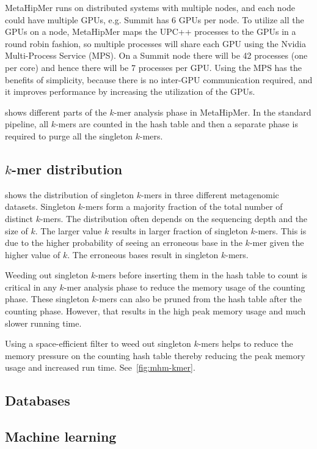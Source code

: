 MetaHipMer runs on distributed systems with multiple nodes, and each node could
have multiple GPUs, e.g. Summit has 6 GPUs per node. To utilize all the GPUs on
a node, MetaHipMer maps the UPC++ processes to the GPUs in a round robin
fashion, so multiple processes will share each GPU using the Nvidia
Multi-Process Service (MPS). On a Summit node there will be 42 processes (one
per core) and hence there will be 7 processes per GPU\@. Using the MPS has the
benefits of simplicity, because there is no inter-GPU communication required,
and it improves performance by increasing the utilization of the GPUs.

 shows different parts of the $k$-mer analysis phase in
MetaHipMer. In the standard pipeline, all $k$-mers are counted in the hash table
and then a separate phase is required to purge all the singleton $k$-mers.

\subsection{$k$-mer distribution}

 shows the distribution of singleton $k$-mers in three
different metagenomic datasets. Singleton $k$-mers form a majority fraction of
the total number of distinct $k$-mers. The distribution often depends on the
sequencing depth and the size of $k$. The larger value $k$ results in larger
fraction of singleton $k$-mers. This is due to the higher probability of seeing
an erroneous base in the $k$-mer given the higher value of $k$. The erroneous
bases result in singleton $k$-mers.

Weeding out singleton $k$-mers before inserting them in the hash table to count
is critical in any $k$-mer analysis phase to reduce the memory usage of the
counting phase. These singleton $k$-mers can also be pruned from the hash table
after the counting phase. However, that results in the high peak memory usage
and much slower running time.

Using a space-efficient filter to weed out singleton $k$-mers helps to reduce
the memory pressure on the counting hash table thereby reducing the peak memory
usage and increased run time. See~\cref{fig:mhm-kmer}.

\subsection{Databases}

\subsection{Machine learning}

